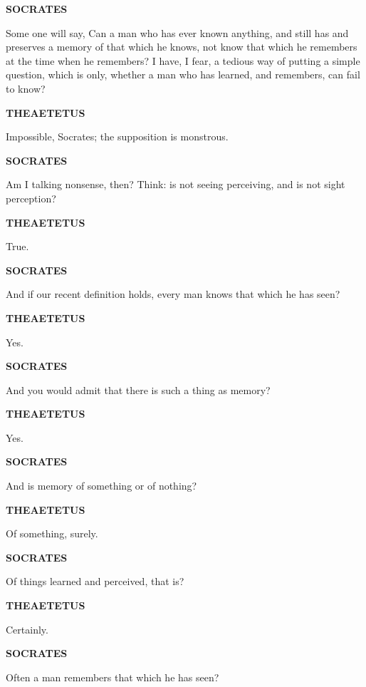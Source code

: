 \documentclass[11pt,letter]{article}
\begin{document}
\par \textbf{SOCRATES}
\par   Some one will say, Can a man who has ever known anything, and still has and preserves a memory of that which he knows, not know that which he remembers at the time when he remembers? I have, I fear, a tedious way of putting a simple question, which is only, whether a man who has learned, and remembers, can fail to know?

\par \textbf{THEAETETUS}
\par   Impossible, Socrates; the supposition is monstrous.

\par \textbf{SOCRATES}
\par   Am I talking nonsense, then? Think:  is not seeing perceiving, and is not sight perception?

\par \textbf{THEAETETUS}
\par   True.

\par \textbf{SOCRATES}
\par   And if our recent definition holds, every man knows that which he has seen?

\par \textbf{THEAETETUS}
\par   Yes.

\par \textbf{SOCRATES}
\par   And you would admit that there is such a thing as memory?

\par \textbf{THEAETETUS}
\par   Yes.

\par \textbf{SOCRATES}
\par   And is memory of something or of nothing?

\par \textbf{THEAETETUS}
\par   Of something, surely.

\par \textbf{SOCRATES}
\par   Of things learned and perceived, that is?

\par \textbf{THEAETETUS}
\par   Certainly.

\par \textbf{SOCRATES}
\par   Often a man remembers that which he has seen?
\end{document}
